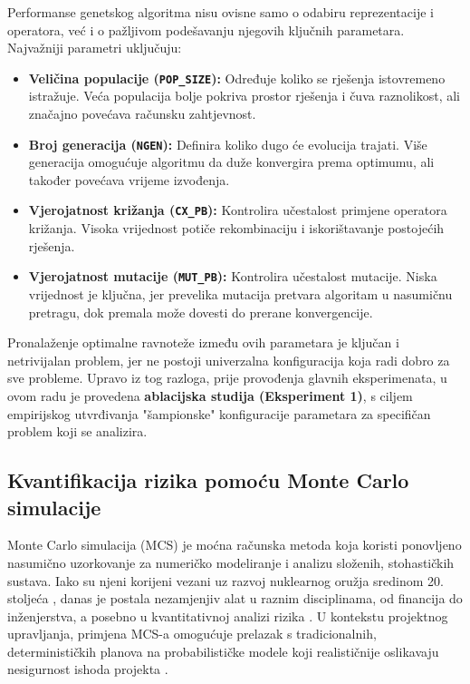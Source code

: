 Performanse genetskog algoritma nisu ovisne samo o odabiru reprezentacije i operatora, već i o pažljivom podešavanju njegovih ključnih parametara. Najvažniji parametri uključuju:
\begin{itemize}
    \item \textbf{Veličina populacije (\texttt{POP\_SIZE}):} Određuje koliko se rješenja istovremeno istražuje. Veća populacija bolje pokriva prostor rješenja i čuva raznolikost, ali značajno povećava računsku zahtjevnost.
    \item \textbf{Broj generacija (\texttt{NGEN}):} Definira koliko dugo će evolucija trajati. Više generacija omogućuje algoritmu da duže konvergira prema optimumu, ali također povećava vrijeme izvođenja.
    \item \textbf{Vjerojatnost križanja (\texttt{CX\_PB}):} Kontrolira učestalost primjene operatora križanja. Visoka vrijednost potiče rekombinaciju i iskorištavanje postojećih rješenja.
    \item \textbf{Vjerojatnost mutacije (\texttt{MUT\_PB}):} Kontrolira učestalost mutacije. Niska vrijednost je ključna, jer prevelika mutacija pretvara algoritam u nasumičnu pretragu, dok premala može dovesti do prerane konvergencije.
\end{itemize}
Pronalaženje optimalne ravnoteže između ovih parametara je ključan i netrivijalan problem, jer ne postoji univerzalna konfiguracija koja radi dobro za sve probleme. Upravo iz tog razloga, prije provođenja glavnih eksperimenata, u ovom radu je provedena \textbf{ablacijska studija (Eksperiment 1)}, s ciljem empirijskog utvrđivanja "šampionske" konfiguracije parametara za specifičan problem koji se analizira.
\subsection{Kvantifikacija rizika pomoću Monte Carlo simulacije}
\label{sec:mcs}

Monte Carlo simulacija (MCS) je moćna računska metoda koja koristi ponovljeno nasumično uzorkovanje za numeričko modeliranje i analizu složenih, stohastičkih sustava. Iako su njeni korijeni vezani uz razvoj nuklearnog oružja sredinom 20. stoljeća \cite{Metropolis1949}, danas je postala nezamjenjiv alat u raznim disciplinama, od financija do inženjerstva, a posebno u kvantitativnoj analizi rizika \cite{Vose2008}. U kontekstu projektnog upravljanja, primjena MCS-a omogućuje prelazak s tradicionalnih, determinističkih planova na probabilističke modele koji realističnije oslikavaju nesigurnost ishoda projekta \cite{Miller2009, Avlijas2008}.

